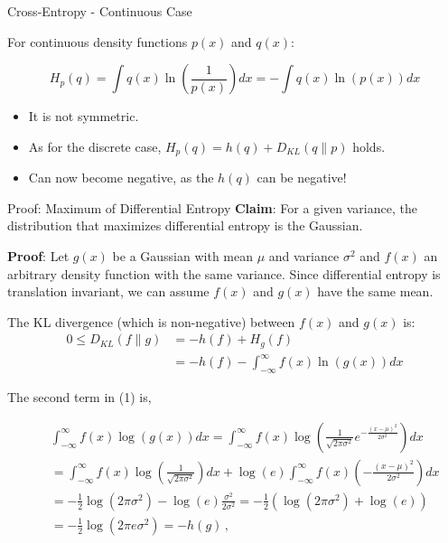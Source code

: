 \begin{vbframe} {Cross-Entropy - Continuous Case}

For continuous density functions $p(x)$ and $q(x)$: 

$$ H_p(q) = \int q(x) \ln\left(\frac{1}{p(x)}\right) dx = - \int q(x) \ln\left(p(x)\right) dx $$

\begin{itemize}
\item It is not symmetric.
\item As for the discrete case, $H_p(q) = h(q) + D_{KL}(q \| p)$ holds.
\item Can now become negative, as the $h(q)$ can be negative! 
\end{itemize}
\end{vbframe}
 
\begin{vbframe}{Proof: Maximum of Differential Entropy}
  \textbf{Claim}: For a given variance, the distribution that maximizes differential entropy is the Gaussian.

  \lz

  \textbf{Proof}: Let $g(x)$ be a Gaussian with mean $\mu$ and variance $\sigma^2$ and $f(x)$ an arbitrary density function with the same variance. Since differential entropy is translation invariant, we can assume $f(x)$ and $g(x)$ have the same mean.

  \lz
  
  The KL divergence (which is non-negative) between $f(x)$ and $g(x)$ is:
  \begin{equation}
    \begin{aligned}
       0 \leq D_{KL}(f \| g) & = -h(f) + H_g(f) \\
                             & =-h(f)-\int_{-\infty}^{\infty} f(x) \ln (g(x)) dx
    \end{aligned}
  \end{equation}
  
  \framebreak
  
The second term in (1) is, 
  
\begin{footnotesize}
\begin{eqnarray}
& & \int_{-\infty}^{\infty} f(x) \log (g(x)) d x =\int_{-\infty}^{\infty} f(x) \log \left(\frac{1}{\sqrt{2 \pi \sigma^{2}}} e^{-\frac{(x-\mu)^{2}}{2 \sigma^{2}}}\right) d x \nonumber\\ 
& &=\int_{-\infty}^{\infty} f(x) \log \left(\frac{1}{\sqrt{2 \pi \sigma^{2}}}\right) d x+\log (e) \int_{-\infty}^{\infty} f(x)\left(-\frac{(x-\mu)^{2}}{2 \sigma^{2}}\right) d x \nonumber\\ 
& &= -\frac{1}{2} \log \left(2 \pi \sigma^{2}\right)-\log (e) \frac{\sigma^{2}}{2 \sigma^{2}} = -\frac{1}{2} (\log \left(2 \pi \sigma^{2}\right)+\log (e) ) \nonumber\\ 
& &=-\frac{1}{2} \log \left(2 \pi e \sigma^{2}\right) = -h(g) \,,
\end{eqnarray}
\end{footnotesize}


\end{vbframe}
